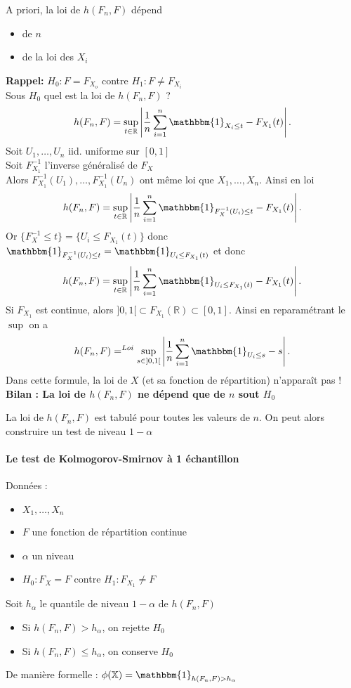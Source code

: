 \documentclass{article}
\theoremstyle{plain}%
\theoremstyle{definition}
\theoremstyle{remark}
\begin{document}
A priori, la loi de $ h(F_n, F) $ dépend \begin{itemize}
    \item de $ n $ 
    \item de la loi des $ X_i $ 
\end{itemize}
\textbf{Rappel: } $ H_0: F = F_{X_o} $ contre $ H_1: F \neq F_{X_i} $ \\
Sous $ H_0 $ quel est la loi de $ h(F_n, F) $ ? 
\[
    h(F_n, F) = \sup _{t \in \mathbb{R}} \left| \frac{1}{n}\sum_{i=1}^{n}\mathbbm{1}_{X_i \leq t} - F_{X_1}(t)  \right| 
.\]
Soit $ U_1, \dots, U_n $ iid. uniforme sur $ [0,1] $ \\
Soit $ F_{X_1}^{-1} $ l'inverse généralisé de $ F_X $ \\
Alors $ F_{X_1}^{-1}(U_1), \dots, F_{X_1}^{-1}(U_n) $ ont même loi que $ X_1, \dots, X_n $. Ainsi en loi 
\[
    h(F_n, F) = \sup _{t \in \mathbb{R}} \left| \frac{1}{n}\sum_{i=1}^{n}\mathbbm{1}_{F_X^{-1}(U_i) \leq t} - F_{X_1}(t)  \right| 
.\]
Or $ \{F_X^{-1} \leq t\} = \{U_i \leq F_{X_1}(t)\} $ donc $ \mathbbm{1}_{F_X^{-1}(U_i) \leq t} = \mathbbm{1}_{U_i \leq F_{X_1}(t)} $ et donc 
\[
    h(F_n, F) = \sup _{t \in \mathbb{R}} \left| \frac{1}{n}\sum_{i=1}^{n}\mathbbm{1}_{U_i \leq F_{X_1}(t)} - F_{X_1}(t)  \right| 
.\]
Si $ F_{X_1} $ est continue, alors $  ]0,1[ \subset F_{X_1} (\mathbb{R}) \subset [0,1] $. Ainsi en reparamétrant le $ \sup $ on a 
\[
    h(F_n, F) =^{Loi} \sup _{s \in ]0,1[} \left| \frac{1}{n}\sum_{i=1}^{n} \mathbbm{1}_{U_i \leq s} - s \right| 
.\]
Dans cette formule, la loi de $ X $ (et sa fonction de répartition) n'apparaît pas ! \\
\textbf{Bilan : La loi de $ h(F_n, F) $ ne dépend que de $ n $ sout $ H_0 $ }

La loi de $ h(F_n, F) $ est tabulé pour toutes les valeurs de $ n $. On peut alors construire un test de niveau $ 1 - \alpha $

\paragraph{Le test de Kolmogorov-Smirnov à 1 échantillon \\}

Données : \begin{itemize}
    \item $ X_1, \dots, X_n $
    \item $ F $ une fonction de répartition continue
    \item $\alpha$ un niveau
    \item $ H_0: F_X = F $ contre $ H_1: F_{X_1} \neq F $
\end{itemize}
Soit $ h_\alpha $ le quantile de niveau $ 1 - \alpha $ de $ h(F_n, F) $
\begin{itemize}
    \item Si $ h(F_n, F) > h_\alpha $, on rejette $ H_0 $ 
    \item Si $ h(F_n, F) \leq h_\alpha  $, on conserve $ H_0 $ 
\end{itemize}
De manière formelle : $ \phi (\mathbb{X}) = \mathbbm{1}_{h(F_n, F) > h_\alpha } $ 
\end{document}
